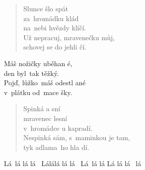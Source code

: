 \begin{song}{}
\begin{verse}
   Slunce šlo spát \\
   za~hromádku klád \\
   na~nebi hvězdy klíčí.    \\
   Už nepracuj, mravenečku můj, \\
   schovej se do jehli čí.
\end{verse}
\begin{refren}
   Máš nožičky uběhan é,   \\
   den byl~tak těžký.   \\
   Pojď, lůžko~máš odestl ané    \\
   v~plátku od~mace šky.
\end{refren}
\begin{verse}
   Spinká a sní \\
   mravenec lesní \\
   v~hromádce u kapradí.    \\
   Nespinká sám, s~maminkou je tam, \\
   tyk adlama~ho hla dí.
\end{verse}
\begin{refren}
   Lá~lá lá lá~ Lálálá lá  lá~  Lá~lá lá   Lá lá lá~ lá
\end{refren}
\end{song}
\pagebreak
